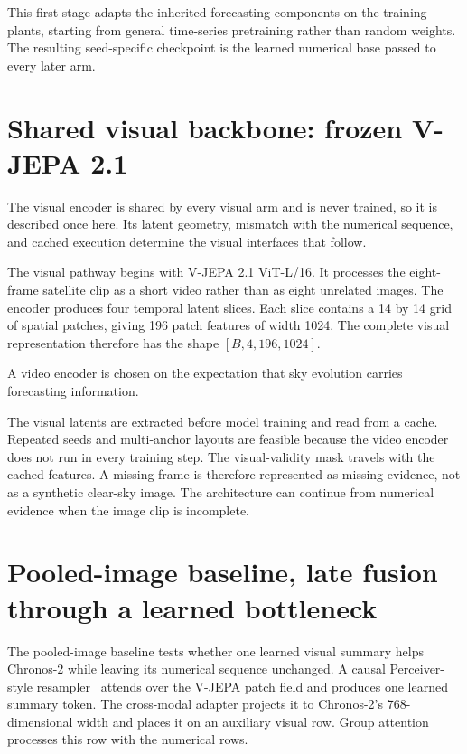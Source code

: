 This first stage adapts the inherited forecasting components on the training plants, starting from general time-series pretraining rather than random weights. The resulting seed-specific checkpoint is the learned numerical base passed to every later arm.

\section{Shared visual backbone: frozen V-JEPA 2.1}

The visual encoder is shared by every visual arm and is never trained, so it is described once here. Its latent geometry, mismatch with the numerical sequence, and cached execution determine the visual interfaces that follow.

The visual pathway begins with V-JEPA 2.1 ViT-L/16. It processes the eight-frame satellite clip as a short video rather than as eight unrelated images. The encoder produces four temporal latent slices. Each slice contains a 14 by 14 grid of spatial patches, giving 196 patch features of width 1024. The complete visual representation therefore has the shape $[B,4,196,1024]$.

A video encoder is chosen on the expectation that sky evolution carries forecasting information.

The visual latents are extracted before model training and read from a cache. Repeated seeds and multi-anchor layouts are feasible because the video encoder does not run in every training step. The visual-validity mask travels with the cached features. A missing frame is therefore represented as missing evidence, not as a synthetic clear-sky image. The architecture can continue from numerical evidence when the image clip is incomplete.

\section{Pooled-image baseline, late fusion through a learned bottleneck}

The pooled-image baseline tests whether one learned visual summary helps Chronos-2 while leaving its numerical sequence unchanged. A causal Perceiver-style resampler~\cite{perceiver} attends over the V-JEPA patch field and produces one learned summary token. The cross-modal adapter projects it to Chronos-2's 768-dimensional width and places it on an auxiliary visual row. Group attention processes this row with the numerical rows.

